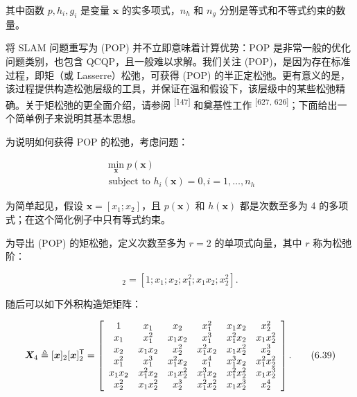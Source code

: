 其中函数 $p , h _ { i } , g _ { i }$ 是变量 $\pmb{x}$ 的实多项式，$n _ { h }$ 和 $n _ { g }$ 分别是等式和不等式约束的数量。

将 SLAM 问题重写为 (POP) 并不立即意味着计算优势：POP 是非常一般的优化问题类别，也包含 QCQP，且一般难以求解。我们关注 (POP)，是因为存在标准过程，即矩（或 Lasserre）松弛，可获得 (POP) 的半正定松弛。更有意义的是，该过程提供构造松弛层级的工具，并保证在温和假设下，该层级中的某些松弛精确。关于矩松弛的更全面介绍，请参阅 \textsuperscript{[147]} 和奠基性工作 \textsuperscript{[627, 626]}；下面给出一个简单例子来说明其基本思想。

为说明如何获得 POP 的松弛，考虑问题：

\begin{equation}
\begin{array}{c} \min _ {\boldsymbol {x}} p (\boldsymbol {x}) \\ \text { subject   to } h _ {i} (\boldsymbol {x}) = 0, i = 1, \ldots , n _ {h} \end{array}\tag{6.37}
\end{equation}

为简单起见，假设 $\pmb { x } = [ x _ { 1 } ; x _ { 2 } ]$，且 $p ( \pmb x )$ 和 $h ( \pmb x )$ 都是次数至多为 4 的多项式；在这个简化例子中只有等式约束。

为导出 (POP) 的矩松弛，定义次数至多为 $r = 2$ 的单项式向量，其中 $r$ 称为松弛阶：

\begin{equation}
[ \pmb {x} ] _ {2} = [ 1; x _ {1}; x _ {2}; x _ {1} ^ {2}; x _ {1} x _ {2}; x _ {2} ^ {2} ].\tag{6.38}
\end{equation}

随后可以如下外积构造矩矩阵：

\begin{equation}
\boldsymbol {X} _ {4} \triangleq [ \boldsymbol {x} ] _ {2} [ \boldsymbol {x} ] _ {2} ^ {\mathsf {T}} = \left[ \begin{array}{c c c c c c} 1 & x _ {1} & x _ {2} & x _ {1} ^ {2} & x _ {1} x _ {2} & x _ {2} ^ {2} \\ x _ {1} & x _ {1} ^ {2} & x _ {1} x _ {2} & x _ {1} ^ {3} & x _ {1} ^ {2} x _ {2} & x _ {1} x _ {2} ^ {2} \\ x _ {2} & x _ {1} x _ {2} & x _ {2} ^ {2} & x _ {1} ^ {2} x _ {2} & x _ {1} x _ {2} ^ {2} & x _ {2} ^ {3} \\ x _ {1} ^ {2} & x _ {1} ^ {3} & x _ {1} ^ {2} x _ {2} & x _ {1} ^ {4} & x _ {1} ^ {3} x _ {2} & x _ {1} ^ {2} x _ {2} ^ {2} \\ x _ {1} x _ {2} & x _ {1} ^ {2} x _ {2} & x _ {1} x _ {2} ^ {2} & x _ {1} ^ {3} x _ {2} & x _ {1} ^ {2} x _ {2} ^ {2} & x _ {1} x _ {2} ^ {3} \\ x _ {2} ^ {2} & x _ {1} x _ {2} ^ {2} & x _ {2} ^ {3} & x _ {1} ^ {2} x _ {2} ^ {2} & x _ {1} x _ {2} ^ {3} & x _ {2} ^ {4} \end{array} \right].\tag{6.39}
\end{equation}


